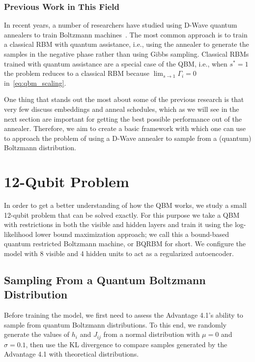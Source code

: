 \subsubsection{Previous Work in This Field}
In recent years, a number of researchers have studied using D-Wave quantum annealers to train Boltzmann machines~\cite{adachi_2015,benedetti_2016,anschuetz_2019,wiebe_2019,rocutto_2020,dixit_2021,ilmo_2021,wilson_2021,xu_2021}.
The most common approach is to train a classical RBM with quantum assistance, i.e., using the annealer to generate the samples in the negative phase rather than using Gibbs sampling.
Classical RBMs trained with quantum assistance are a special case of the QBM, i.e., when \( s^* = 1 \) the problem reduces to a classical RBM because \( \lim_{s\rightarrow 1} \Gamma_i = 0 \) in~\cref{eq:qbm_scaling}.

One thing that stands out the most about some of the previous research is that very few discuss embeddings and anneal schedules, which as we will see in the next section are important for getting the best possible performance out of the annealer.
Therefore, we aim to create a basic framework with which one can use to approach the problem of using a D-Wave annealer to sample from a (quantum) Boltzmann distribution.

\section{12-Qubit Problem}\label{sec:qbm_12_qubit_problem}
In order to get a better understanding of how the QBM works, we study a small 12-qubit problem that can be solved exactly.
For this purpose we take a QBM with restrictions in both the visible and hidden layers and train it using the log-likelihood lower bound maximization approach; we call this a bound-based quantum restricted Boltzmann machine, or BQRBM for short.
We configure the model with 8 visible and 4 hidden units to act as a regularized autoencoder.

\subsection{Sampling From a Quantum Boltzmann Distribution}
Before training the model, we first need to assess the Advantage 4.1's ability to sample from quantum Boltzmann distributions.
To this end, we randomly generate the values of \( h_i \) and \( J_{ij} \) from a normal distribution with \( \mu = 0 \) and \( \sigma = 0.1 \), then use the KL divergence to compare samples generated by the Advantage 4.1 with theoretical distributions.

